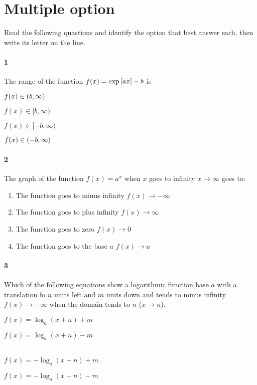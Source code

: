 \documentclass[main.tex]{subfiles}
\begin{document}
\section{Multiple option}
Read the following quastions and identify the option that best answer each, then write its letter on the line.

\paragraph{1} The range of the function $f(x)=\exp\qty[ax]-b$ is

\begin{enumerate*}
    \item $f(x)\in\qty(b,\infty)\quad$
    \item $f(x)\in[b,\infty)\quad$
    \item $f(x)\in[-b,\infty)\quad$
    \item $f(x)\in\qty(-b,\infty)\quad$
\end{enumerate*}

\paragraph{2} The graph of the function $f(x)=a^x$ when $x$ goes to infinity $x\to\infty$ goes to:

\begin{enumerate}
    \item The function goes to minus infinity $f(x)\to-\infty\quad$
    \item The function goes to plus infinity $f(x)\to\infty\quad$
    \item The function goes to zero $f(x)\to 0\quad$
    \item The function goes to the base $a$ $f(x)\to a\quad$
\end{enumerate}

\paragraph{3} Which of the following equations show a logarithmic function base $a$ with a translation fo $n$ units left and $m$ units down and tends to minus infinity $f(x)\to-\infty$ when the domain tends to $n$ ($x\to n$).

\begin{enumerate*}
    \item $f(x)=\log_a(x+n)+m\quad$
    \item $f(x)=\log_a(x+n)-m$ \\\\
    \item $f(x)=-\log_a(x-n)+m\quad$
    \item $f(x)=-\log_a(x-n)-m\quad$
\end{enumerate*}
\end{document}
